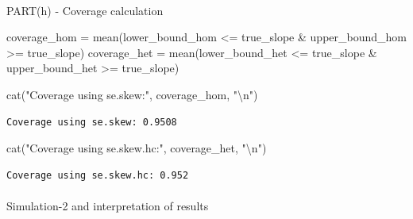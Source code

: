 \documentclass[
  11pt,
]{article}
\makeatletter
\let\oldparagraph\paragraph
\renewcommand{\paragraph}{
    \@ifstar
      \xxxParagraphStar
      \xxxParagraphNoStar
  }
\newcommand{\xxxParagraphStar}[1]{\oldparagraph*{#1}\mbox{}}
\newcommand{\xxxParagraphNoStar}[1]{\oldparagraph{#1}\mbox{}}
\newenvironment{Shaded}{\begin{snugshade}}{\end{snugshade}}
\newcommand{\FunctionTok}[1]{\textcolor[rgb]{0.28,0.35,0.67}{#1}}
\newcommand{\NormalTok}[1]{\textcolor[rgb]{0.00,0.23,0.31}{#1}}
\newcommand{\OtherTok}[1]{\textcolor[rgb]{0.00,0.23,0.31}{#1}}
\newcommand{\SpecialCharTok}[1]{\textcolor[rgb]{0.37,0.37,0.37}{#1}}
\newcommand{\StringTok}[1]{\textcolor[rgb]{0.13,0.47,0.30}{#1}}
\makeatother
\begin{document}
\paragraph{PART(h) - Coverage
calculation}\label{parth---coverage-calculation}

\begin{Shaded}
\begin{Highlighting}[]
\NormalTok{coverage\_hom }\OtherTok{=} \FunctionTok{mean}\NormalTok{(lower\_bound\_hom }\SpecialCharTok{\textless{}=}\NormalTok{ true\_slope }\SpecialCharTok{\&} 
\NormalTok{                      upper\_bound\_hom }\SpecialCharTok{\textgreater{}=}\NormalTok{ true\_slope)}
\NormalTok{coverage\_het }\OtherTok{=} \FunctionTok{mean}\NormalTok{(lower\_bound\_het }\SpecialCharTok{\textless{}=}\NormalTok{ true\_slope }\SpecialCharTok{\&} 
\NormalTok{                      upper\_bound\_het }\SpecialCharTok{\textgreater{}=}\NormalTok{ true\_slope)}

\FunctionTok{cat}\NormalTok{(}\StringTok{"Coverage using se.skew:"}\NormalTok{, coverage\_hom, }\StringTok{"}\SpecialCharTok{\textbackslash{}n}\StringTok{"}\NormalTok{)}
\end{Highlighting}
\end{Shaded}

\begin{verbatim}
Coverage using se.skew: 0.9508 
\end{verbatim}

\begin{Shaded}
\begin{Highlighting}[]
\FunctionTok{cat}\NormalTok{(}\StringTok{"Coverage using se.skew.hc:"}\NormalTok{, coverage\_het, }\StringTok{"}\SpecialCharTok{\textbackslash{}n}\StringTok{"}\NormalTok{)}
\end{Highlighting}
\end{Shaded}

\begin{verbatim}
Coverage using se.skew.hc: 0.952 
\end{verbatim}

\paragraph{Simulation-2 and interpretation of
results}\label{simulation-2-and-interpretation-of-results}
\end{document}
